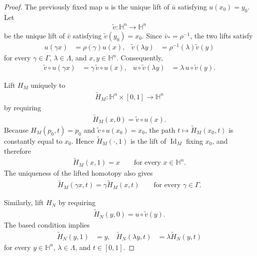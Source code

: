 \documentclass[11pt]{amsart}
\theoremstyle{plain}
\theoremstyle{plain}
\theoremstyle{plain}
\newcommand{\Id}{\operatorname{Id}}
\numberwithin{equation}{section}
\begin{document}
\begin{proof}
The previously fixed map \(u\) is the unique lift of \(\bar u\) satisfying
\(u(x_0)=y_0\).  Let
\begin{align}
\widetilde v:\mathbb H^n\longrightarrow\mathbb H^n
\nonumber
\end{align}
be the unique lift of \(\bar v\) satisfying
\(\widetilde v(y_0)=x_0\).  Since \(\bar v_*=\rho^{-1}\), the two lifts
satisfy
\begin{align}
u(\gamma x)&=\rho(\gamma)u(x),
&
\widetilde v(\lambda y)&=\rho^{-1}(\lambda)\widetilde v(y)
\nonumber
\end{align}
for every \(\gamma\in\Gamma\), \(\lambda\in\Lambda\), and
\(x,y\in\mathbb H^n\).  Consequently,
\begin{align}
\widetilde v\circ u(\gamma x)
&=\gamma\,\widetilde v\circ u(x),
&
u\circ\widetilde v(\lambda y)
&=\lambda\,u\circ\widetilde v(y).
\nonumber
\end{align}

Lift \(H_M\) uniquely to
\begin{align}
\widetilde H_M:\mathbb H^n\times[0,1]\longrightarrow\mathbb H^n
\nonumber
\end{align}
by requiring
\begin{align}
\widetilde H_M(x,0)=\widetilde v\circ u(x).
\nonumber
\end{align}
Because \(H_M(p_0,t)=p_0\) and
\(\widetilde v\circ u(x_0)=x_0\), the path
\(t\mapsto\widetilde H_M(x_0,t)\) is constantly equal to \(x_0\).
Hence \(\widetilde H_M(\cdot,1)\) is the lift of \(\Id_M\) fixing
\(x_0\), and therefore
\begin{align}
\widetilde H_M(x,1)=x
\qquad\text{for every }x\in\mathbb H^n.
\nonumber
\end{align}
The uniqueness of the lifted homotopy also gives
\begin{align}
\widetilde H_M(\gamma x,t)
=\gamma\widetilde H_M(x,t)
\qquad
\text{for every }\gamma\in\Gamma.
\nonumber
\end{align}

Similarly, lift \(H_N\) by requiring
\begin{align}
\widetilde H_N(y,0)=u\circ\widetilde v(y).
\nonumber
\end{align}
The based condition implies
\begin{align}
\widetilde H_N(y,1)&=y,
&
\widetilde H_N(\lambda y,t)
&=\lambda\widetilde H_N(y,t)
\nonumber
\end{align}
for every \(y\in\mathbb H^n\), \(\lambda\in\Lambda\), and
\(t\in[0,1]\).


\end{proof}
\end{document}
